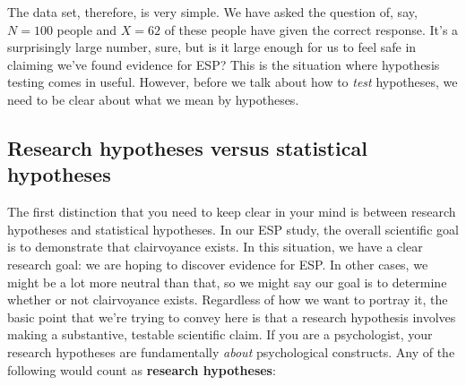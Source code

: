 \documentclass[
  11pt,
  a4paper,
  twoside,symmetric,openright]{book}
\theoremstyle{break}
\theoremstyle{break}
\begin{document}
The data set, therefore, is very simple. We have asked the question of, say, \(N = 100\) people and \(X = 62\) of these people have given the correct response. It's a surprisingly large number, sure, but is it large enough for us to feel safe in claiming we've found evidence for ESP? This is the situation where hypothesis testing comes in useful. However, before we talk about how to \emph{test} hypotheses, we need to be clear about what we mean by hypotheses.

\subsection{Research hypotheses versus statistical hypotheses}\label{research-hypotheses-versus-statistical-hypotheses}

The first distinction that you need to keep clear in your mind is between research hypotheses and statistical hypotheses. In our ESP study, the overall scientific goal is to demonstrate that clairvoyance exists. In this situation, we have a clear research goal: we are hoping to discover evidence for ESP. In other cases, we might be a lot more neutral than that, so we might say our goal is to determine whether or not clairvoyance exists. Regardless of how we want to portray it, the basic point that we're trying to convey here is that a research hypothesis involves making a substantive, testable scientific claim. If you are a psychologist, your research hypotheses are fundamentally \emph{about} psychological constructs. Any of the following would count as \textbf{research hypotheses}:
\end{document}
